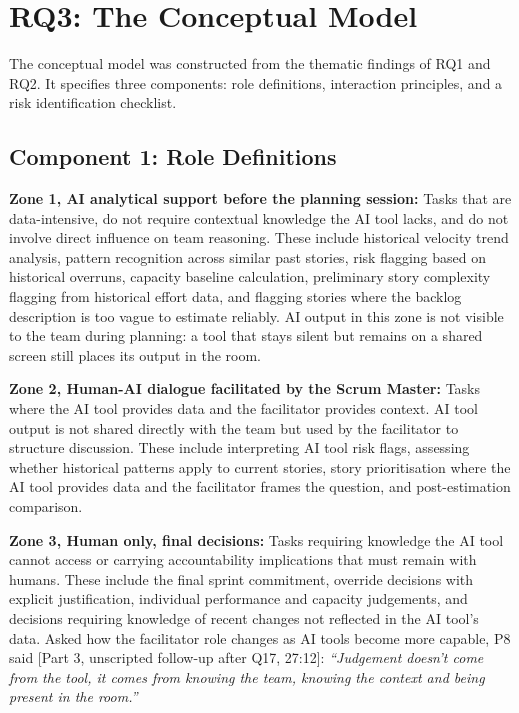 \documentclass[a4paper,twoside]{bth}
\begin{document}
\section{RQ3: The Conceptual Model}
\label{sec:model}

The conceptual model was constructed from the thematic findings of RQ1 and RQ2. It specifies three components: role definitions, interaction principles, and a risk identification checklist.

\subsection{Component 1: Role Definitions}

\textbf{Zone 1, AI analytical support before the planning session:} Tasks that are data-intensive, do not require contextual knowledge the AI tool lacks, and do not involve direct influence on team reasoning. These include historical velocity trend analysis, pattern recognition across similar past stories, risk flagging based on historical overruns, capacity baseline calculation, preliminary story complexity flagging from historical effort data, and flagging stories where the backlog description is too vague to estimate reliably. AI output in this zone is not visible to the team during planning: a tool that stays silent but remains on a shared screen still places its output in the room.

\textbf{Zone 2, Human-AI dialogue facilitated by the Scrum Master:} Tasks where the AI tool provides data and the facilitator provides context. AI tool output is not shared directly with the team but used by the facilitator to structure discussion. These include interpreting AI tool risk flags, assessing whether historical patterns apply to current stories, story prioritisation where the AI tool provides data and the facilitator frames the question, and post-estimation comparison.

\textbf{Zone 3, Human only, final decisions:} Tasks requiring knowledge the AI tool cannot access or carrying accountability implications that must remain with humans. These include the final sprint commitment, override decisions with explicit justification, individual performance and capacity judgements, and decisions requiring knowledge of recent changes not reflected in the AI tool's data. Asked how the facilitator role changes as AI tools become more capable, P8 said [Part 3, unscripted follow-up after Q17, 27:12]: \textit{``Judgement doesn't come from the tool, it comes from knowing the team, knowing the context and being present in the room.''}
\end{document}
